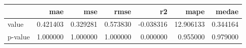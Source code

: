 \begin{tabular}{lrrrrrr}
\toprule
 & mae & mse & rmse & r2 & mape & medae \\
\midrule
value & 0.421403 & 0.329281 & 0.573830 & -0.038316 & 12.906133 & 0.344164 \\
p-value & 1.000000 & 1.000000 & 1.000000 & 0.000000 & 0.955000 & 0.979000 \\
\bottomrule
\end{tabular}
